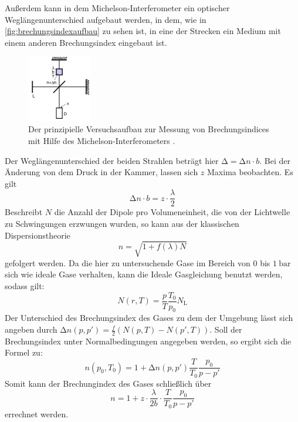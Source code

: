 \noindent
Außerdem kann in dem Michelson-Interferometer ein optischer Weglängenunterschied aufgebaut werden, in dem, wie in \autoref{fig:brechungsindexaufbau} zu sehen ist, in eine der Strecken
ein Medium mit einem anderen Brechungsindex eingebaut ist.
\begin{figure}
    \centering
    \includegraphics[width=0.25\textwidth]{content/brechungsindexaufbau.jpg}
    \caption{Der prinzipielle Versuchsaufbau zur Messung von Brechungsindices mit Hilfe des Michelson-Interferometers \cite{anleitung}.}
    \label{fig:brechungsindexaufbau}
\end{figure}
\noindent
Der Weglängenunterschied der beiden Strahlen beträgt hier $\increment = \increment n \cdot b$. Bei der Änderung von dem Druck in der Kammer, lassen sich $z$ Maxima beobachten. Es gilt
\begin{equation*}
    \increment n \cdot b = z \cdot \frac{\lambda}{2}
\end{equation*}
Beschreibt $N$ die Anzahl der Dipole pro Volumeneinheit, die von der Lichtwelle zu Schwingungen erzwungen wurden, so kann aus der klassischen Dispersionstheorie 
\begin{equation*}
    n = \sqrt{1+ f(\lambda)N}
\end{equation*}
gefolgert werden. Da die hier zu untersuchende Gase im Bereich von 0 bis $\SI{1}{\bar}$ sich wie ideale Gase verhalten, kann die Ideale Gasgleichung benutzt werden, 
sodass gilt:
\begin{equation*}
    N(r,T) = \frac{p}{T}\frac{T_0}{p_0} N_{\text{L}}
\end{equation*}
Der Unterschied des Brechungsindex des Gases zu dem der Umgebung lässt sich angeben durch $\increment n(p, p') = \frac{f}{2} ( N(p,T) - N(p',T) )$. Soll der 
Brechungsindex unter Normalbedingungen angegeben werden, so ergibt sich die Formel zu:
\begin{equation*}
    n(p_0, T_0) = 1 + \increment n(p, p') \frac{T}{T_0} \frac{p_0}{p - p'}
\end{equation*}
Somit kann der Brechungindex des Gases schließlich über
\begin{equation}\label{eqn:forindex}
    n = 1 + z \cdot \frac{\lambda}{2b} \cdot \frac{T}{T_0} \frac{p_0}{p - p'}
\end{equation}
errechnet werden.